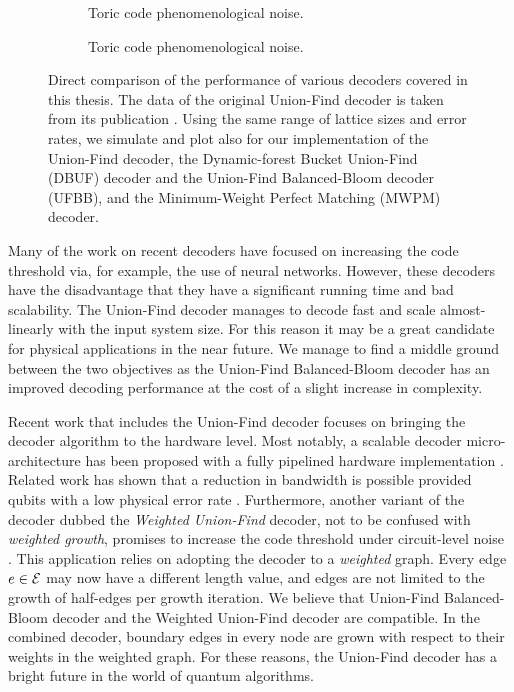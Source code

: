 \begin{figure}[htbp]
  \begin{subfigure}[b]{\textwidth}
    \begin{adjustbox}{Clip=0 1em 0 0}
      
    \end{adjustbox}
    \caption{Toric code phenomenological noise.}
  \end{subfigure}
  \begin{subfigure}[b]{\textwidth}
    \begin{adjustbox}{Clip=0 1em 0 0}
      
    \end{adjustbox}
    \caption{Toric code phenomenological noise.}
  \end{subfigure}
  \caption{Direct comparison of the performance of various decoders covered in this thesis. The data of the original Union-Find decoder is taken from its publication \cite{delfosse2017almost}. Using the same range of lattice sizes and error rates, we simulate and plot also for our implementation of the Union-Find decoder, the Dynamic-forest Bucket Union-Find (DBUF) decoder and the Union-Find Balanced-Bloom decoder (UFBB), and the Minimum-Weight Perfect Matching (MWPM) decoder.}\label{fig:directcomp}
\end{figure}

Many of the work on recent decoders have focused on increasing the code threshold via, for example, the use of neural networks. However, these decoders have the disadvantage that they have a significant running time and bad scalability. The Union-Find decoder manages to decode fast and scale almost-linearly with the input system size. For this reason it may be a great candidate for physical applications in the near future. We manage to find a middle ground between the two objectives as the Union-Find Balanced-Bloom decoder has an improved decoding performance at the cost of a slight increase in complexity. 

Recent work that includes the Union-Find decoder focuses on bringing the decoder algorithm to the hardware level. Most notably, a scalable decoder micro-architecture has been proposed with a fully pipelined hardware implementation \cite{das2020scalable}. Related work has shown that a reduction in bandwidth is possible provided qubits with a low physical error rate \cite{delfosse2020hierarchical}. Furthermore, another variant of the decoder dubbed the \emph{Weighted Union-Find} decoder, not to be confused with \emph{weighted growth}, promises to increase the code threshold under circuit-level noise \cite{huang2020fault}. This application relies on adopting the decoder to a \emph{weighted} graph. Every edge $e\in\mathcal{E}$ may now have a different length value, and edges are not limited to the growth of half-edges per growth iteration. We believe that Union-Find Balanced-Bloom decoder and the Weighted Union-Find decoder are compatible. In the combined decoder, boundary edges in every node are grown with respect to their weights in the weighted graph. For these reasons, the Union-Find decoder has a bright future in the world of quantum algorithms.
